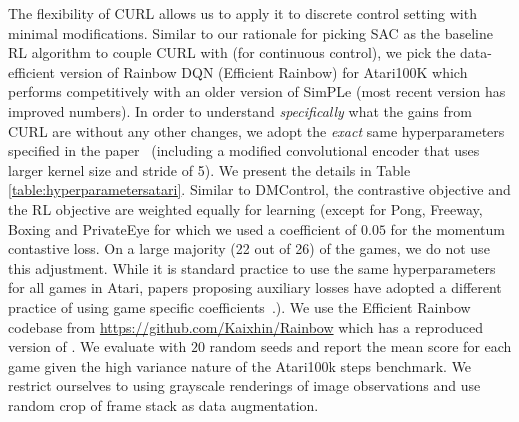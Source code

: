 \documentclass{article}
\begin{document}
The flexibility of CURL allows us to apply it to discrete control setting with minimal modifications. Similar to our rationale for picking SAC as the baseline RL algorithm to couple CURL with (for continuous control), we pick the data-efficient version of Rainbow DQN (Efficient Rainbow) \cite{van2019use} for Atari100K which performs competitively with an older version of SimPLe (most recent version has improved numbers). In order to understand {\it specifically} what the gains from CURL are without any other changes, we adopt the {\it exact} same hyperparameters specified in the paper~\cite{van2019use} (including a modified convolutional encoder that uses larger kernel size and stride of 5). We present the details in Table \ref{table:hyperparametersatari}. Similar to DMControl, the contrastive objective and the RL objective are weighted equally for learning (except for Pong, Freeway, Boxing and PrivateEye for which we used a coefficient of $0.05$ for the momentum contastive loss. On a large majority (22 out of 26) of the games, we do not use this adjustment. While it is standard practice to use the same hyperparameters for all games in Atari, papers proposing auxiliary losses have adopted a different practice of using game specific coefficients~\cite{jaderberg2016reinforcement}.). We use the Efficient Rainbow codebase from \url{https://github.com/Kaixhin/Rainbow} which has a reproduced version of \citet{van2019use}. We evaluate with $20$ random seeds and report the mean score for each game given the high variance nature of the Atari100k steps benchmark. We restrict ourselves to using grayscale renderings of image observations and use random crop of frame stack as data augmentation.
\end{document}
